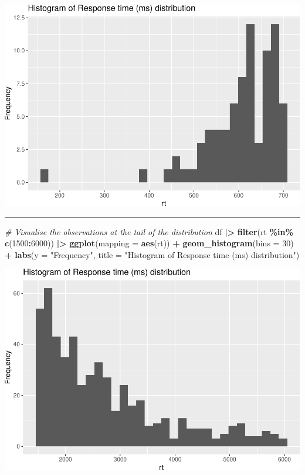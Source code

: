 \documentclass[
]{article}
\newenvironment{Shaded}{\begin{snugshade}}{\end{snugshade}}
\newcommand{\AttributeTok}[1]{\textcolor[rgb]{0.13,0.29,0.53}{#1}}
\newcommand{\CommentTok}[1]{\textcolor[rgb]{0.56,0.35,0.01}{\textit{#1}}}
\newcommand{\DecValTok}[1]{\textcolor[rgb]{0.00,0.00,0.81}{#1}}
\newcommand{\FunctionTok}[1]{\textcolor[rgb]{0.13,0.29,0.53}{\textbf{#1}}}
\newcommand{\NormalTok}[1]{#1}
\newcommand{\SpecialCharTok}[1]{\textcolor[rgb]{0.81,0.36,0.00}{\textbf{#1}}}
\newcommand{\StringTok}[1]{\textcolor[rgb]{0.31,0.60,0.02}{#1}}
\begin{document}
\includegraphics{T5_Data_wrangling_pdf_files/figure-latex/unnamed-chunk-9-1.pdf}

\begin{center}\rule{0.5\linewidth}{0.5pt}\end{center}

\begin{Shaded}
\begin{Highlighting}[]
\CommentTok{\# Visualise the observations at the tail of the distribution}
\NormalTok{df }\SpecialCharTok{|\textgreater{}}
  \FunctionTok{filter}\NormalTok{(rt }\SpecialCharTok{\%in\%} \FunctionTok{c}\NormalTok{(}\DecValTok{1500}\SpecialCharTok{:}\DecValTok{6000}\NormalTok{)) }\SpecialCharTok{|\textgreater{}}
  \FunctionTok{ggplot}\NormalTok{(}\AttributeTok{mapping =} \FunctionTok{aes}\NormalTok{(rt)) }\SpecialCharTok{+}
  \FunctionTok{geom\_histogram}\NormalTok{(}\AttributeTok{bins =} \DecValTok{30}\NormalTok{) }\SpecialCharTok{+} 
  \FunctionTok{labs}\NormalTok{(}\AttributeTok{y =} \StringTok{"Frequency"}\NormalTok{,}
       \AttributeTok{title =} \StringTok{"Histogram of Response time (ms) distribution"}\NormalTok{)}
\end{Highlighting}
\end{Shaded}

\includegraphics{T5_Data_wrangling_pdf_files/figure-latex/unnamed-chunk-10-1.pdf}
\end{document}
